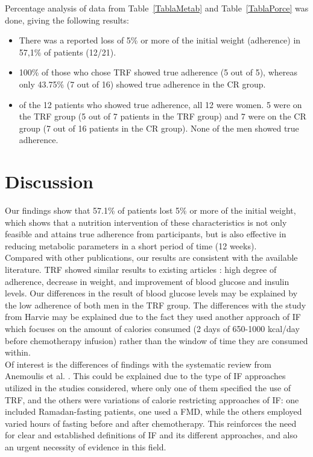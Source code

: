 \documentclass[journal,article,submit,pdftex,moreauthors]{Definitions/mdpi}
\begin{document}
{Percentage analysis of data from Table~\ref{TablaMetab} and Table~\ref{TablaPorce} was done, giving the following results:\\



\begin{itemize}
\item	There was a reported loss of 5\% or more of the initial weight (adherence) in 57,1\% of patients (12/21).
\item	100\% of those who chose TRF showed true adherence (5 out of 5), whereas only 43.75\% (7 out of 16) showed true adherence in the CR group.
\item	 of the 12 patients who showed true adherence, all 12 were women. 5 were on the TRF group (5 out of 7 patients in the TRF group) and 7 were on the CR group (7 out of 16 patients in the CR group). None of the men showed true adherence.
\end{itemize}
}
\section{Discussion}

Our findings show that 57.1\% of patients lost 5\% or more of the initial weight, which shows that a nutrition intervention of these characteristics is not only feasible and attains true adherence from participants, but is also effective in reducing metabolic parameters in a short period of time (12 weeks).\\

Compared with other publications, our results are consistent with the available literature. TRF showed similar results to existing articles \cite{kalam2023intermittent}: high degree of adherence, decrease in weight, and improvement of blood glucose and insulin levels. Our differences in the result of blood glucose levels may be explained by the low adherence of both men in the TRF group. The differences with the study from Harvie \cite{harvie2022randomised} may be explained due to the fact they used another approach of IF which focuses on the amount of calories consumed (2 days of 650-1000 kcal/day before chemotherapy infusion) rather than the window of time they are consumed within.\\

Of interest is the differences of findings with the systematic review from Anemoulis et al. \cite{anemoulis2023intermittent}. This could be explained due to the type of IF approaches utilized in the studies considered, where only one of them specified the use of TRF, and the others were variations of calorie restricting approaches of IF: one included Ramadan-fasting patients, one used a FMD, while the others employed varied hours of fasting before and after chemotherapy. This reinforces the need for clear and established definitions of IF and its different approaches, and also an urgent necessity of evidence in this field.\\
\end{document}
